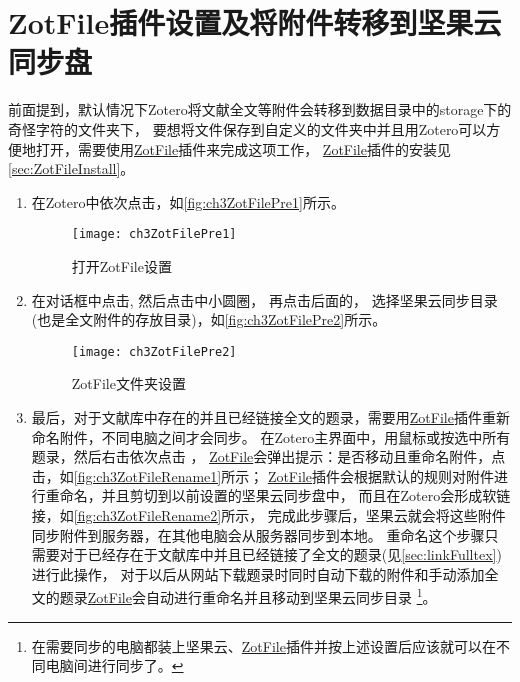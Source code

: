 \documentclass[cn,11pt,chinese]{elegantbook}
\begin{document}
	\section{ZotFile插件设置及将附件转移到坚果云同步盘}\label{sec:zotFilePre}
		前面提到，默认情况下Zotero将文献全文等附件会转移到数据目录中的storage下的奇怪字符的文件夹下，
		要想将文件保存到自定义的文件夹中并且用Zotero可以方便地打开，需要使用\href{http://zotfile.com/}{ZotFile}插件来完成这项工作，
		\href{http://zotfile.com/}{ZotFile}插件的安装见\cref{sec:ZotFileInstall}。
		\begin{enumerate}
			\item 在Zotero中依次点击，如\autoref{fig:ch3ZotFilePre1}所示。
			\begin{figure}[t]
				\centering
				\texttt{[image: ch3ZotFilePre1]}
				\caption{打开ZotFile设置}
				\label{fig:ch3ZotFilePre1}
			\end{figure}
			\item 在对话框中点击,
			然后点击中小圆圈，
			再点击后面的，
			选择坚果云同步目录(也是全文附件的存放目录)，如\autoref{fig:ch3ZotFilePre2}所示。
			\begin{figure}[htbp]
				\centering
				\texttt{[image: ch3ZotFilePre2]}
				\caption{ZotFile文件夹设置}
				\label{fig:ch3ZotFilePre2}
			\end{figure}
			\item 最后，对于文献库中存在的并且已经链接全文的题录，需要用\href{http://zotfile.com/}{ZotFile}插件重新命名附件，不同电脑之间才会同步。
			在Zotero主界面中，用鼠标或按选中所有题录，然后右击依次点击
			，
			\href{http://zotfile.com/}{ZotFile}会弹出提示：是否移动且重命名附件，点击，如\autoref{fig:ch3ZotFileRename1}所示；
			\href{http://zotfile.com/}{ZotFile}插件会根据默认的规则对附件进行重命名，并且剪切到以前设置的坚果云同步盘中，
			而且在Zotero会形成软链接，如\autoref{fig:ch3ZotFileRename2}所示，
			完成此步骤后，坚果云就会将这些附件同步附件到服务器，在其他电脑会从服务器同步到本地。
			重命名这个步骤只需要对于已经存在于文献库中并且已经链接了全文的题录(见\cref{sec:linkFulltex})进行此操作，
			对于以后从网站下载题录时同时自动下载的附件和手动添加全文的题录\href{http://zotfile.com/}{ZotFile}会自动进行重命名并且移动到坚果云同步目录
			\footnote{在需要同步的电脑都装上坚果云、\href{http://zotfile.com/}{ZotFile}插件并按上述设置后应该就可以在不同电脑间进行同步了。}。
	



\end{enumerate}
\end{document}
